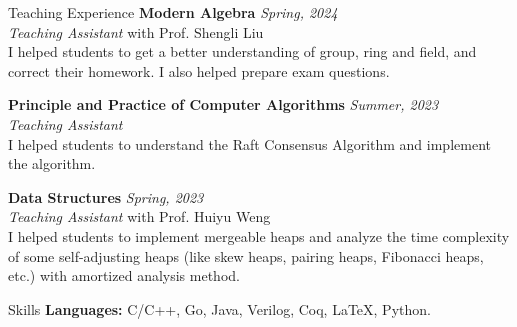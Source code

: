 \documentclass{resume} %
\begin{document}
\begin{rSection}{Teaching Experience}
  {\bf Modern Algebra} \hfill {\em Spring, 2024}\\
  \emph{Teaching Assistant} with Prof. Shengli Liu
  \\ I helped students to get a better understanding of group, ring and field, and correct their homework. I also helped prepare exam questions.

  {\bf Principle and Practice of Computer Algorithms} \hfill {\em Summer, 2023}\\
  \emph{Teaching Assistant}
  \\ I helped students to understand the Raft Consensus Algorithm and implement the algorithm.
  
  {\bf Data Structures} \hfill {\em Spring, 2023}\\
  \emph{Teaching Assistant} with Prof. Huiyu Weng
  \\ I helped students to implement mergeable heaps and analyze the time complexity of some self-adjusting heaps (like skew heaps, pairing heaps, Fibonacci heaps, etc.) with amortized analysis method.
\end{rSection}
  
\begin{rSection}{Skills}
  {\bf Languages: } C/C++, Go, Java, Verilog, Coq, \LaTeX, Python.
  
  \end{rSection}
  


\end{document}
